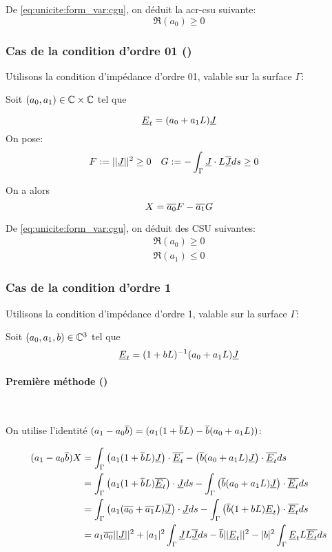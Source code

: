 De \eqref{eq:unicite:form_var:cgu}, on déduit la \gls{acr-csu} suivante:
\begin{equation}
\Re\left(a_0\right) \ge 0
\end{equation}

\subsubsection{Cas de la condition d'ordre 01 (\cite{stupfel_sufficient_2011})}
Utilisons la condition d’impédance d'ordre 01, valable sur la surface $\Gamma$:

Soit $(a_0, a_1) \in \mathbb C\times\mathbb C$ tel que

\[
\underline{E}_t = (a_0 +a_1L)\underline{J}
\]
On pose:
\begin{align*}
F&:= || \underline{J}|| ^2 \ge 0  & G&:= -\int_\Gamma \underline{J}\cdot L{\overline{\underline{J}}} ds \ge 0
\end{align*}

On a alors
\begin{equation*}
X = {\overline{a_0}}F - {\overline{a_1}}G
\end{equation*}

De \eqref{eq:unicite:form_var:cgu}, on déduit des CSU suivantes:
\begin{align}
\Re\left(a_0\right) \ge 0\\
\Re\left(a_1\right) \le 0
\end{align}
\subsubsection{Cas de la condition d'ordre 1}


Utilisons la condition d’impédance d'ordre 1, valable sur la surface $\Gamma$: 

Soit $(a_0, a_1,b) \in \mathbb C^3$ tel que
\[
\underline{E}_t = (1 + b L)^{-1} (a_0 + a_1 L) \underline{J}
\]

\paragraph{Première méthode (\cite{stupfel_sufficient_2011})}~

On utilise l'identité $(a_1-a_0{\overline{b}}) = (a_1(1+{\overline{b}}L) - {\overline{b}}(a_0+a_1L))$:

\begin{align*}
(a_1-a_0{\overline{b}})X &= \int_\Gamma \left(a_1(1+{\overline{b}}L) \underline{J}\right)\cdot{\overline{\underline{E}_t}} - \left({\overline{b}}(a_0+a_1L)\underline{J}\right)\cdot{\overline{\underline{E}_t}} ds\\
&= \int_\Gamma \left(a_1(1+{\overline{b}}L) {\overline{\underline{E}_t}}\right)\cdot\underline{J} ds - \int_\Gamma \left({\overline{b}}(a_0+a_1L)\underline{J}\right)\cdot{\overline{\underline{E}_t}} ds\\
&= \int_\Gamma \left(a_1({\overline{a_0}}+{\overline{a_1}}L) {\overline{\underline{J}}}\right)\cdot\underline{J} ds  - \int_\Gamma \left({\overline{b}}(1+bL)\underline{E}_t\right)\cdot{\overline{\underline{E}_t}} ds\\
&= a_1{\overline{a_0}} ||\underline{J}||^2 + |a_1|^2 \int_\Gamma \underline{J} L {\overline{\underline{J}}} ds - {\overline{b}} ||\underline{E}_t||^2 - |b|^2 \int_\Gamma \underline{E}_t L {\overline{\underline{E}_t}} ds
\end{align*}

